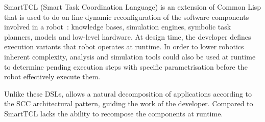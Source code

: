 SmartTCL (Smart Task Coordination Language) is an extension of
Common Lisp that is used to do on line dynamic reconfiguration of the
software components involved in a robot~\cite{Stec11a}: knowledge
bases, simulation engines, symbolic task planners, models and
low-level hardware. At design time, the developer defines execution
variants that robot operates at runtime. In order to lower robotics
inherent complexity, analysis and simulation tools could also be used
at runtime to determine pending execution steps with specific
parametrisation before the robot effectively execute them.

Unlike these DSLs, \diaspec{} allows a natural decomposition of
applications according to the SCC architectural pattern, guiding the
work of the developer. Compared to SmartTCL \diaspec{} lacks the
ability to recompose the components at runtime.

